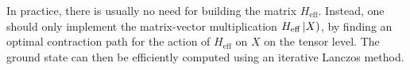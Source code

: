 \noindent In practice, there is usually no need for building the matrix $H_{\mathrm{eff}}$. Instead, one should only implement the matrix-vector multiplication $H_{\mathrm{eff}} \left| X \right)$, by finding an optimal contraction path for the action of $H_{\mathrm{eff}}$ on $X$ on the tensor level. The ground state can then be efficiently computed using an iterative Lanczos method. \cite{orus2014practical}